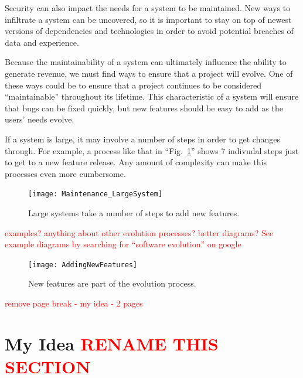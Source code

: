 \documentclass[12pt,conference]{IEEEtran}
\newcommand\todo[1]{\textcolor{red}{#1}}
\begin{document}
Security can also impact the needs for a system to be maintained. New ways to infiltrate a system can be uncovered, so it is important to stay on top of newest versions of dependencies and technologies in order to avoid potential breaches of data and experience.


Because the maintainability of a system can ultimately influence the ability to generate revenue, we must find ways to ensure that a project will evolve. One of these ways could be to ensure that a project continues to be considered ``maintainable'' throughout its lifetime. This characteristic of a system will ensure that bugs can be fixed quickly, but new features should be easy to add as the users' needs evolve.

If a system is large, it may involve a number of steps in order to get changes through. For example, a process like that in ``Fig.~\ref{figLargeSystemMaintenance}'' shows 7 indivudal steps just to get to a new feature release. Any amount of complexity can make this processes even more cumbersome.

\begin{figure}[ht]
    \centerline{
        \texttt{[image: Maintenance\_LargeSystem]}
    }
    \caption{Large systems take a number of steps to add new features.}
    \label{figLargeSystemMaintenance}
\end{figure}

\todo{examples? anything about other evolution processes? better diagrams?}
\todo{See example diagrams by searching for ``software evolution'' on google}

\begin{figure}[ht]
    \centerline{
        \texttt{[image: AddingNewFeatures]}
    }
    \caption{New features are part of the evolution process.}
    \label{figAddingNewFeatures}
\end{figure}

\newpage \todo{remove page break - my idea - 2 pages}

\section{My Idea \todo{RENAME THIS SECTION}}

\end{document}
